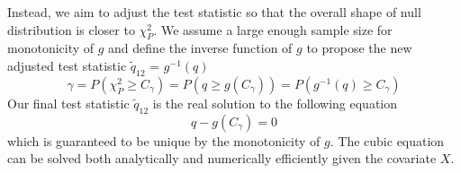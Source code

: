 \documentclass[aap,authoryear, preprint]{imsart}
\numberwithin{equation}{section}
\theoremstyle{plain}
\begin{document}
\vspace{5mm} 
Instead, we aim to adjust the test statistic so that the overall shape of null distribution is closer to $\chi_{P}^2$. We assume a large enough sample size for monotonicity of $g$ and define the inverse function of $g$ to propose the new adjusted test statistic $\tilde{q}_{12}$ = $g^{-1}(q)$
$$\gamma = P(\chi_{P}^2 \geq C_{\gamma}) = P(q \geq g(C_{\gamma})) = P(g^{-1}(q) \geq C_{\gamma})$$
Our final test statistic $\tilde{q}_{12}$ is the real solution to the following equation 
$$q - g(C_{\gamma}) = 0$$
which is guaranteed to be unique by the monotonicity of $g$. The cubic equation can be solved both analytically and numerically efficiently given the covariate $X$. 
\end{document}
